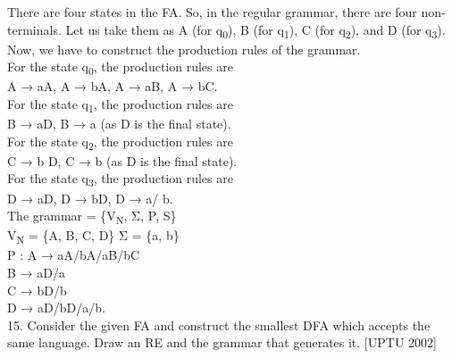 \documentclass[10pt,a4paper]{book}
\begin{document}
There are four states in the FA. So, in the regular grammar, there are four non-terminals.
 Let us take them as A (for q\textsubscript{0}), B (for q\textsubscript{1}), C (for q\textsubscript{2}), and D (for q\textsubscript{3}).\\Now, we have to construct the production rules of the grammar.\\For the state q\textsubscript{0}, the production rules are\\ \hspace*{3cm} A → aA, A → bA, A → aB, A → bC.\\For the state q\textsubscript{1}, the production rules are\\ \hspace*{3cm} B → aD, B → a (as D is the final state).\\ For the state q\textsubscript{2}, the production rules are\\ \hspace*{3cm} C → b D, C → b (as D is the final state).\\For the state q\textsubscript{3}, the production rules are\\ \hspace*{3cm} D → aD, D → bD, D → a/ b.\\The grammar = \{V\textsubscript{N}, Σ, P, S\}\\ \hspace*{3cm}V\textsubscript{N} = \{A, B, C, D\} Σ = \{a, b\}\\
 \hspace*{3cm}P : A → aA/bA/aB/bC\\
 \hspace*{3cm}B → aD/a\\
 \hspace*{3cm}C → bD/b\\
 \hspace*{3cm}D → aD/bD/a/b.\\ \newpage
 \hspace*{-1.2cm} 15. Consider the given FA and construct the smallest DFA which accepts the same language. Draw an
RE and the grammar that generates it. \hspace*{1cm}[UPTU 2002]
\end{document}
